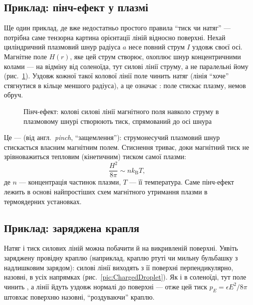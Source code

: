 \subsection*{Приклад: пінч-ефект у плазмі}

Ще один приклад, де вже недостатньо простого правила \enquote{тиск чи натяг} --- потрібна саме тензорна картина орієнтації ліній відносно
поверхні. Нехай циліндричний плазмовий шнур радіуса $a$ несе повний струм $I$ уздовж своєї осі. Магнітне поле $H(r)$, яке цей струм створює,
охоплює шнур концентричними колами --- на відміну від соленоїда, тут силові лінії  струму, а не паралельні йому
(рис.~\ref{pic:PinchEffect}). Уздовж кожної такої колової лінії поле чинить натяг (лінія \enquote{хоче} стягнутися в кільце меншого радіуса), а
це означає : поле стискає плазму, немов обруч.

\begin{figure}[h!]\centering
	\caption{Пінч-ефект: колові силові лінії магнітного поля навколо струму в плазмовому шнурі створюють тиск, спрямований
		до осі шнура\label{pic:PinchEffect}}
\end{figure}

Це ---  (від англ.\ \emph{pinch}, \enquote{защемлення}): струмонесучий плазмовий шнур стискається власним магнітним полем.
Стиснення триває, доки магнітний тиск не зрівноважиться тепловим (кінетичним) тиском самої плазми:
\begin{equation}\label{eq:PinchBalance}
	\frac{H^2}{8\pi} \sim n k_{\text{B}} T,
\end{equation}
де $n$ --- концентрація частинок плазми, $T$ --- її температура. Саме пінч-ефект лежить в основі найпростіших схем магнітного утримання плазми в
термоядерних установках.

\subsection*{Приклад: заряджена крапля}

Натяг і тиск силових ліній можна побачити й на викривленій поверхні. Уявіть заряджену провідну краплю (наприклад, краплю ртуті чи мильну
бульбашку з надлишковим зарядом): силові лінії виходять з її поверхні перпендикулярно, назовні, в усіх напрямках (рис.~\ref{pic:ChargedDroplet}).
Як і в соленоїді, тут поле чинить , а лінії йдуть уздовж нормалі до поверхні --- отже цей тиск $p_E=\epsilon E^2/8\pi$
штовхає поверхню назовні, \enquote{роздуваючи} краплю.

